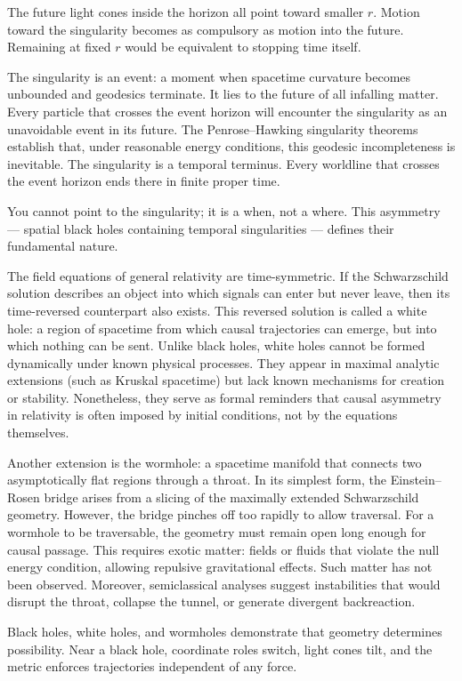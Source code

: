 The future light cones inside the horizon all point toward smaller $r$. Motion toward the singularity becomes as compulsory as motion into the future. Remaining at fixed $r$ would be equivalent to stopping time itself.


The singularity is an event: a moment when spacetime curvature becomes unbounded and geodesics terminate. It lies to the future of all infalling matter. Every particle that crosses the event horizon will encounter the singularity as an unavoidable event in its future. The Penrose–Hawking singularity theorems establish that, under reasonable energy conditions, this geodesic incompleteness is inevitable. The singularity is a temporal terminus. Every worldline that crosses the event horizon ends there in finite proper time.

You cannot point to the singularity; it is a when, not a where. This asymmetry — spatial black holes containing temporal singularities — defines their fundamental nature.


The field equations of general relativity are time-symmetric. If the Schwarzschild solution describes an object into which signals can enter but never leave, then its time-reversed counterpart also exists. This reversed solution is called a white hole: a region of spacetime from which causal trajectories can emerge, but into which nothing can be sent. Unlike black holes, white holes cannot be formed dynamically under known physical processes. They appear in maximal analytic extensions (such as Kruskal spacetime) but lack known mechanisms for creation or stability. Nonetheless, they serve as formal reminders that causal asymmetry in relativity is often imposed by initial conditions, not by the equations themselves.


Another extension is the wormhole: a spacetime manifold that connects two asymptotically flat regions through a throat. In its simplest form, the Einstein–Rosen bridge arises from a slicing of the maximally extended Schwarzschild geometry. However, the bridge pinches off too rapidly to allow traversal. For a wormhole to be traversable, the geometry must remain open long enough for causal passage. This requires exotic matter: fields or fluids that violate the null energy condition, allowing repulsive gravitational effects. Such matter has not been observed. Moreover, semiclassical analyses suggest instabilities that would disrupt the throat, collapse the tunnel, or generate divergent backreaction.


Black holes, white holes, and wormholes demonstrate that geometry determines possibility. Near a black hole, coordinate roles switch, light cones tilt, and the metric enforces trajectories independent of any force.

